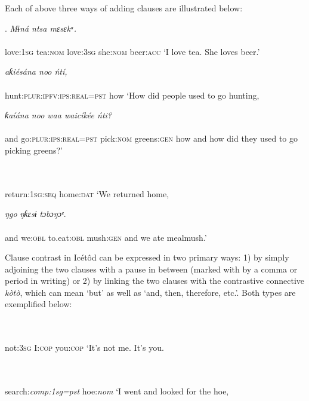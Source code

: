Each of above three ways of adding clauses are illustrated below:




\ea\label{ex:}
.\textit{   Mɨná       ntsa   mɛsɛkᵃ.} \\
    \\
love:\textsc{1sg}   tea:\textsc{nom}   love:\textsc{3sg} she:\textsc{nom}   beer:\textsc{acc}
\glt ‘I love tea. She loves beer.’ 
\z




\ea\label{ex:}
\textit{aƙiésána noo       ńtí,} \\
    \\
hunt:\textsc{plur:ipfv:ips:real=pst}   how
\glt ‘How did people used to go hunting, 
\z



\ea\label{ex:}
\textit{   ƙaíána noo         waa   waicíkée     ńti?} \\
    \\
and   go:\textsc{plur:ips:real=pst} pick:\textsc{nom} greens:\textsc{gen} how
\glt and how did they used to go picking greens?’
\z  



\ea\label{ex:}
 \\
    \\
return:\textsc{1sg:seq} home:\textsc{dat} 
\glt ‘We returned home, 
\z



\ea\label{ex:}
\textit{}  \textit{ŋgo}\textit{}     \textit{ŋƙɛsɨ}\textit{}     \textit{tɔbɔŋɔᵉ}. \\
    \\
and   we:\textsc{obl}   to.eat:\textsc{obl}   mush:\textsc{gen}
\glt and we ate mealmush.’
\z  

Clause contrast in Icétôd can be expressed in two primary ways: 1) by simply adjoining the two clauses with a pause in between (marked with by a comma or period in writing) or 2) by linking the two clauses with the contrastive connective \textit{kòtò}, which can mean ‘but’ as well as ‘and, then, therefore, etc.’. Both types are exemplified below:



\ea\label{ex:}
 \\
    \\
not:\textsc{3sg}   I:\textsc{cop}     you:\textsc{cop}
\glt ‘It’s not me. It’s you. 
\z




\ea\label{ex:}
 \\
    \\
search:\textit{comp:1sg=pst}   hoe:\textit{nom}
\glt ‘I went and looked for the hoe, 
\z



